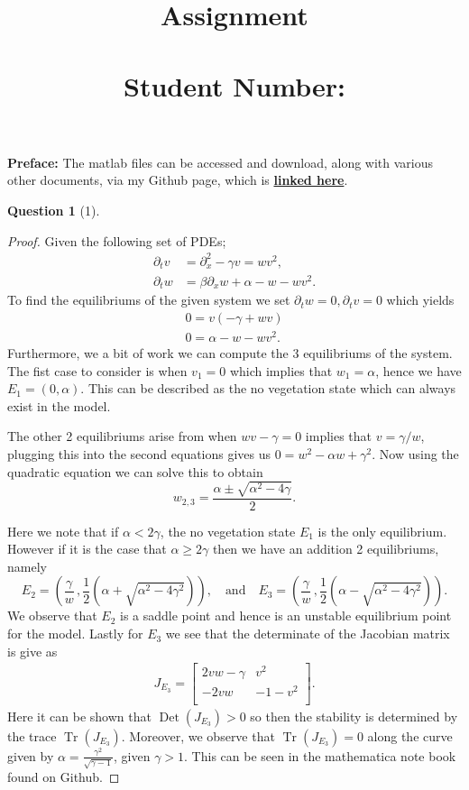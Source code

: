 \documentclass[11pt]{article}
\author{}
\title{\vspace{-50pt}
    \Huge \subject \\ Assignment \hw
\\ \vspace{20pt} \large \name \\ Student Number:\SID}
\date{}
\theoremstyle{quest}
\newtheorem*{question}{Question}
\newcommand{\Dp}{\partial}
\DeclareMathOperator{\Tr}{Tr}
\DeclareMathOperator{\Det}{Det}
\begin{document}
\maketitle{}

\textbf{Preface:} The matlab files can be accessed and download, along with various 
other documents, via my Github page, which is \href{https://github.com/JamesZor/NLDS_Assignment3}{\color{blue} \textbf{linked here}}.


\begin{question}[1]
\end{question}
\begin{proof}
    Given the following set of PDEs;
    \begin{align*}
        \Dp_t v &= \Dp_{x}^{2} - \gamma v = wv^2, \\
        \Dp_t w &= \beta \Dp_x w +\alpha -w -wv^2.
    \end{align*}
    To find the equilibriums of the given system we set $ \Dp_t w = 0, \Dp_t v = 0$ which yields
    \begin{align*}
        0= v \left( -\gamma + w v \right)\\
        0= \alpha -w -wv^2.
    \end{align*}
    Furthermore, we a bit of work we can compute the 3 equilibriums of the system.
    The fist case to consider is when $v_1 =0$ which implies that $w_1 =\alpha$, hence we have
    $E_1 = \left( 0, \alpha  \right)$. This can be described as the no vegetation state which
    can always exist in the model.

    The other 2 equilibriums arise from when $ wv-\gamma =0$ implies that $v=\gamma / w$, plugging this
    into the second equations gives us $0=w^2 - \alpha w + \gamma^2$. Now using the quadratic equation
    we can solve this to obtain $$ w_{2,3} = \frac{\alpha \pm \sqrt{ \alpha^2 - 4 \gamma }}{2}.$$

    Here we note that if $\alpha < 2 \gamma$, the no vegetation state $E_1$ is the only equilibrium.
    However if it is the case that $ \alpha \geq 2 \gamma$ then we have an addition 2 equilibriums, namely
    $$ E_2 = \left( \frac{\gamma }{w} \, , \frac{1}{2}\left(\alpha + \sqrt{\alpha^2 -4\gamma^2} \right)  \right),
    \quad \text{and} \quad E_3 = \left( \frac{\gamma }{w}\, , \frac{1}{2} \left(\alpha -\sqrt{\alpha^2 -4\gamma^2} \right)  \right). $$
    We observe that $E_2$ is a saddle point and hence is an unstable equilibrium point for the model.
    Lastly for $E_3$ we see that the determinate of the Jacobian matrix is give as
    \begin{align*}
        J_{E_3} = 
        \begin{bmatrix}
            2vw - \gamma & v^2 \\
            -2vw & -1 -v^2 \\
        \end{bmatrix}
        .
    \end{align*}
    Here it can be shown that $\Det(J_{E_3}) > 0$ so then the stability is determined by the trace $\Tr(J_{E_3})$.
    Moreover, we observe that $\Tr(J_{E_3}) = 0$ along the curve given by $\alpha = \frac{\gamma^2}{\sqrt{\gamma-1}}$, given
    $\gamma > 1$. This can be seen in the mathematica note book found on Github.
\end{proof}
\end{document}
